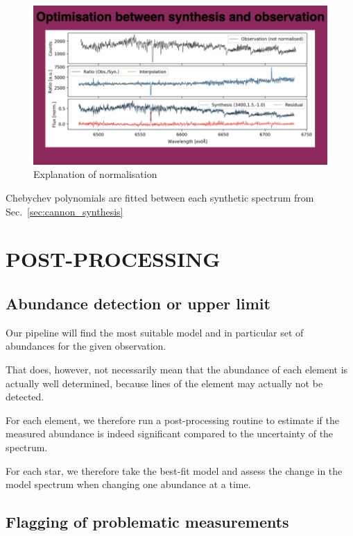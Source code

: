 \documentclass[
  journal=pasa,
  manuscript=research-paper, %
  year=2021,
  volume=37,
]{cup-journal}
\begin{document}
\begin{figure}[hbt!]
 \centering
 \includegraphics[width=\columnwidth]{figures/ratio_normalisation.png}
 \caption{Explanation of normalisation}
 \label{fig:ratio_normalisation}
\end{figure}

Chebychev polynomials are fitted between each synthetic spectrum from Sec.~\ref{sec:cannon_synthesis}

\section{POST-PROCESSING}

\subsection{Abundance detection or upper limit}

Our pipeline will find the most suitable model and in particular set of abundances for the given observation.

That does, however, not necessarily mean that the abundance of each element is actually well determined, because lines of the element may actually not be detected.

For each element, we therefore run a post-processing routine to estimate if the measured abundance is indeed significant compared to the uncertainty of the spectrum.

For each star, we therefore take the best-fit model and assess the change in the model spectrum when changing one abundance at a time.

\subsection{Flagging of problematic measurements}
\end{document}
